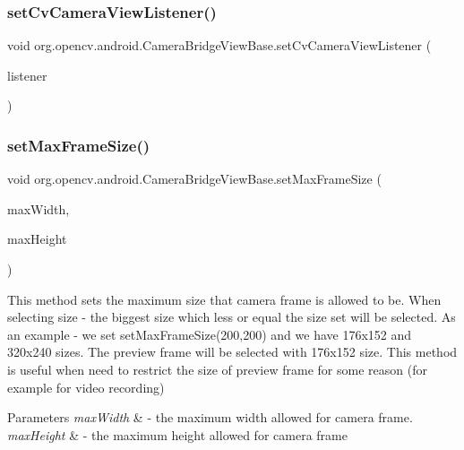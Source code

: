 \subsubsection{\texorpdfstring{set\+Cv\+Camera\+View\+Listener()}{setCvCameraViewListener()}\hspace{0.1cm}{\footnotesize\ttfamily [2/2]}}
{\footnotesize\ttfamily void org.\+opencv.\+android.\+Camera\+Bridge\+View\+Base.\+set\+Cv\+Camera\+View\+Listener (\begin{DoxyParamCaption}\item[{\mbox{\hyperlink{interfaceorg_1_1opencv_1_1android_1_1_camera_bridge_view_base_1_1_cv_camera_view_listener}{Cv\+Camera\+View\+Listener}}}]{listener }\end{DoxyParamCaption})}

\mbox{\label{classorg_1_1opencv_1_1android_1_1_camera_bridge_view_base_a8166e82c8dde050925312149f77fe0b6}} 
\subsubsection{\texorpdfstring{set\+Max\+Frame\+Size()}{setMaxFrameSize()}}
{\footnotesize\ttfamily void org.\+opencv.\+android.\+Camera\+Bridge\+View\+Base.\+set\+Max\+Frame\+Size (\begin{DoxyParamCaption}\item[{int}]{max\+Width,  }\item[{int}]{max\+Height }\end{DoxyParamCaption})}

This method sets the maximum size that camera frame is allowed to be. When selecting size -\/ the biggest size which less or equal the size set will be selected. As an example -\/ we set set\+Max\+Frame\+Size(200,200) and we have 176x152 and 320x240 sizes. The preview frame will be selected with 176x152 size. This method is useful when need to restrict the size of preview frame for some reason (for example for video recording) 
\begin{DoxyParams}{Parameters}
{\em max\+Width} & -\/ the maximum width allowed for camera frame. \\
\hline
{\em max\+Height} & -\/ the maximum height allowed for camera frame \\
\hline
\end{DoxyParams}
\mbox{\label{classorg_1_1opencv_1_1android_1_1_camera_bridge_view_base_ac94df92e0db8ea4ad91c2ff0c71317e0}} 
